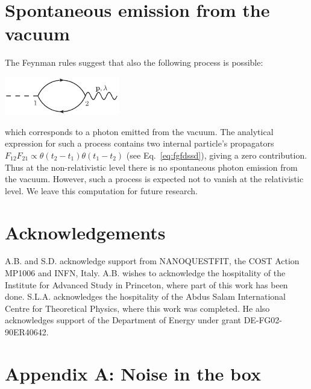 \documentclass[12pt,onecolumn,amssymb,nofootinbib]{revtex4-2} %
\begin{document}
\section{Spontaneous emission from the vacuum}

The Feynman rules suggest that also the following process is possible:
\begin{center}
{\includegraphics[width=5cm, keepaspectratio]{vacuum.eps}}
\end{center}


\noindent which corresponds to a photon emitted from the vacuum. The analytical
expression for such a process contains two internal particle's propagators
$F_{12} F_{21} \varpropto \theta(t_2 - t_1) \theta(t_1 - t_2)$ (see
Eq.~\eqref{eq:fgfdssd}), giving a zero contribution. Thus at the
non-relativistic level there is no spontaneous photon emission from the vacuum.
However, such a process is expected not to vanish at the relativistic level. We leave this computation for future research.

\section*{Acknowledgements}

A.B. and S.D. acknowledge support from NANOQUESTFIT, the COST Action MP1006 and INFN, Italy. A.B. wishes to acknowledge the hospitality of the Institute for Advanced Study in Princeton, where part of this work has been done. S.L.A. acknowledges the hospitality of the Abdus Salam International Centre for Theoretical
Physics, where this work was completed.  He also acknowledges support of the Department of Energy
under grant DE-FG02-90ER40642.

\section*{Appendix A: Noise in the box}
\end{document}
